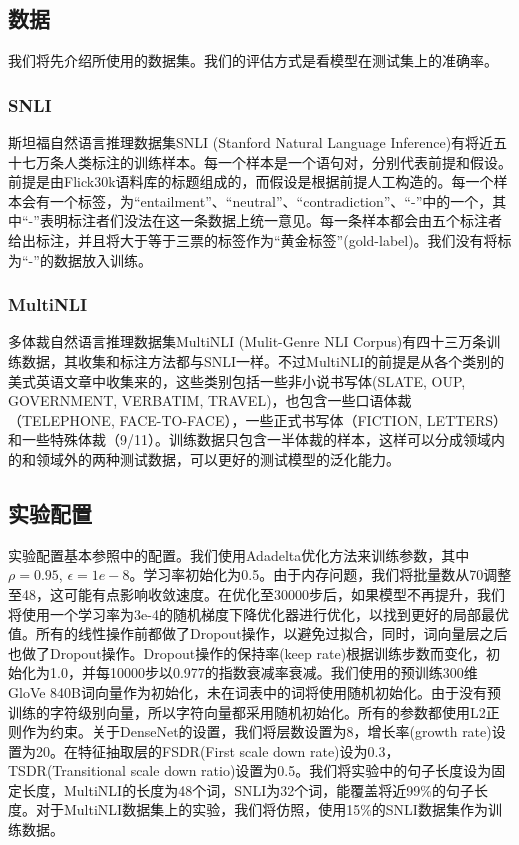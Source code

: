 \documentclass[UTF8,11pt,a4paper,nofonts]{ctexart}
\begin{document}
\subsection{数据}
我们将先介绍所使用的数据集。我们的评估方式是看模型在测试集上的准确率。

\subsubsection{SNLI} 斯坦福自然语言推理数据集SNLI (Stanford Natural Language Inference)\cite{Bowman2015ALA}有将近五十七万条人类标注的训练样本。每一个样本是一个语句对，分别代表前提和假设。前提是由Flick30k语料库的标题组成的，而假设是根据前提人工构造的。每一个样本会有一个标签，为“entailment”、“neutral”、“contradiction”、“-”中的一个，其中“-”表明标注者们没法在这一条数据上统一意见。每一条样本都会由五个标注者给出标注，并且将大于等于三票的标签作为“黄金标签”(gold-label)。我们没有将标为“-”的数据放入训练。

\subsubsection{MultiNLI} 多体裁自然语言推理数据集MultiNLI (Mulit-Genre NLI Corpus)\cite{Nangia2017TheR2}有四十三万条训练数据，其收集和标注方法都与SNLI一样。不过MultiNLI的前提是从各个类别的美式英语文章中收集来的，这些类别包括一些非小说书写体(SLATE, OUP, GOVERNMENT, VERBATIM, TRAVEL)，也包含一些口语体裁（TELEPHONE, FACE-TO-FACE），一些正式书写体（FICTION, LETTERS）和一些特殊体裁（9/11）。训练数据只包含一半体裁的样本，这样可以分成领域内的和领域外的两种测试数据，可以更好的测试模型的泛化能力。

\subsection{实验配置}
实验配置基本参照\cite{yichen2018nli}中的配置。我们使用Adadelta优化方法来训练参数，其中$\rho=0.95$, $\epsilon=1e-8$。学习率初始化为0.5。由于内存问题，我们将批量数从70调整至48，这可能有点影响收敛速度。在优化至30000步后，如果模型不再提升，我们将使用一个学习率为3e-4的随机梯度下降优化器进行优化，以找到更好的局部最优值。所有的线性操作前都做了Dropout操作，以避免过拟合，同时，词向量层之后也做了Dropout操作。Dropout操作的保持率(keep rate)根据训练步数而变化，初始化为1.0，并每10000步以0.977的指数衰减率衰减。我们使用\cite{Pennington2014GloveGV}的预训练300维 GloVe 840B词向量作为初始化，未在词表中的词将使用随机初始化。由于没有预训练的字符级别向量，所以字符向量都采用随机初始化。所有的参数都使用L2正则作为约束。关于DenseNet的设置，我们将层数设置为8，增长率(growth rate)设置为20。在特征抽取层的FSDR(First scale down rate)设为0.3，TSDR(Transitional scale down ratio)设置为0.5。我们将实验中的句子长度设为固定长度，MultiNLI的长度为48个词，SNLI为32个词，能覆盖将近99\%的句子长度。对于MultiNLI数据集上的实验，我们将仿照\cite{Nangia2017TheR2}，使用15\%的SNLI数据集作为训练数据。
\end{document}
